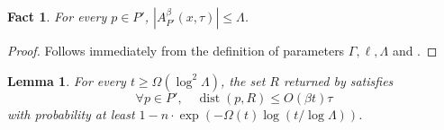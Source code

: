 \documentclass[11pt,letterpaper]{article}
\theoremstyle{plain}
\newtheorem{lemma}[theorem]{Lemma}
\newtheorem{fact}[theorem]{Fact}
\theoremstyle{definition}
\theoremstyle{remark}
\DeclareMathOperator{\dist}{dist}
\begin{document}
    \begin{fact}
        \label{fact:Lambda_ub}
        For every $p \in P'$, $|A_{P'}^\beta(x, \tau)| \leq \Lambda$.
    \end{fact}
    \begin{proof}
        Follows immediately from the definition of parameters $\Gamma, \ell, \Lambda$ and .
    \end{proof}
    
    \begin{lemma}
        \label{lemma:approximation_ratio}
For every $t \geq \Omega(\log^2 \Lambda)$,
        the set $R$ returned by  satisfies
        \begin{equation*}
            \forall p\in P',\quad \dist(p, R) \leq O(\beta t) \tau
        \end{equation*}
        with probability at least $1 - n \cdot \exp(-\Omega(t) \log(t / \log \Lambda))$.
    \end{lemma}
\end{document}

